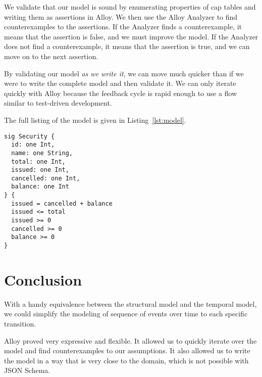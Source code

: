\documentclass[12pt]{article}
\begin{document}
We validate that our model is sound by enumerating properties of cap tables and writing them as assertions in Alloy. We then use the Alloy Analyzer to find counterexamples to the assertions. If the Analyzer finds a counterexample, it means that the assertion is false, and we must improve the model. If the Analyzer does not find a counterexample, it means that the assertion is true, and we can move on to the next assertion.

By validating our model \textit{as we write it}, we can move much quicker than if we were to write the complete model and then validate it. We can only iterate quickly with Alloy because the feedback cycle is rapid enough to use a flow similar to test-driven development.

The full listing of the model is given in Listing~\ref{lst:model}.

\begin{listing}
\begin{verbatim}
sig Security {
  id: one Int,
  name: one String,
  total: one Int,
  issued: one Int,
  cancelled: one Int,
  balance: one Int
} {
  issued = cancelled + balance
  issued <= total
  issued >= 0
  cancelled >= 0
  balance >= 0
}
\end{verbatim}
\label{lst:model}
\end{listing}

\section{Conclusion}

With a handy equivalence between the structural model and the temporal model, we could simplify the modeling of sequence of events over time to each specific transition.

Alloy proved very expressive and flexible. It allowed us to quickly iterate over the model and find counterexamples to our assumptions. It also allowed us to write the model in a way that is very close to the domain, which is not possible with JSON Schema.
\end{document}
